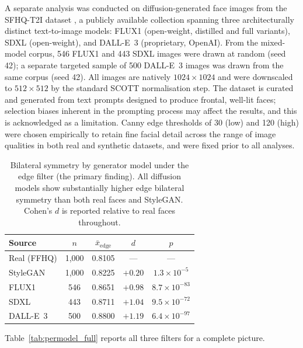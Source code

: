 \documentclass[11pt,a4paper]{article}
\begin{document}
A separate analysis was conducted on diffusion-generated face images from the
SFHQ-T2I dataset \citep{beniaguev2024}, a publicly available collection spanning
three architecturally distinct text-to-image models: FLUX1 (open-weight,
distilled and full variants), SDXL (open-weight), and DALL-E~3 (proprietary,
OpenAI). From the mixed-model corpus, 546 FLUX1 and 443 SDXL images were drawn
at random (seed 42); a separate targeted sample of 500 DALL-E~3 images was drawn
from the same corpus (seed 42). All images are natively $1024 \times 1024$ and
were downscaled to $512 \times 512$ by the standard SCOTT normalisation step.
The dataset is curated and generated from text prompts designed to produce
frontal, well-lit faces; selection biases inherent in the prompting process may
affect the results, and this is acknowledged as a limitation. Canny edge
thresholds of 30 (low) and 120 (high) were chosen empirically to retain fine
facial detail across the range of image qualities in both real and synthetic
datasets, and were fixed prior to all analyses.

\begin{table}[H]
\centering
\caption{Bilateral symmetry by generator model under the edge filter (the
primary finding). All diffusion models show substantially higher edge bilateral
symmetry than both real faces and StyleGAN. Cohen's $d$ is reported relative
to real faces throughout.}
\label{tab:permodel}
\small
\begin{tabular}{lcccc}
\toprule
Source & $n$ & $\bar{x}_\text{edge}$ & $d$ & $p$ \\
\midrule
Real (FFHQ)  & 1,000 & 0.8105 & ---     & ---                   \\
StyleGAN     & 1,000 & 0.8225 & $+0.20$ & $1.3\times10^{-5}$   \\
FLUX1        &   546 & 0.8651 & $+0.98$ & $8.7\times10^{-83}$  \\
SDXL         &   443 & 0.8711 & $+1.04$ & $9.5\times10^{-72}$  \\
DALL-E~3     &   500 & 0.8800 & $+1.19$ & $6.4\times10^{-97}$  \\
\bottomrule
\end{tabular}
\end{table}

Table~\ref{tab:permodel_full} reports all three filters for a complete picture.
\end{document}
